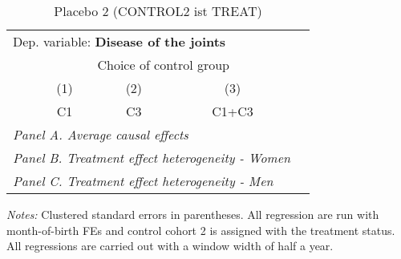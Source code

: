  \begin{table}[H] \centering \begin{threeparttable} \caption{Placebo 2 (CONTROL2 ist TREAT) } {\def\sym#1{\ifmmode^{#1}\else\(^{#1}\)\fi} \begin{tabular}{l*{4}{c}} \toprule \multicolumn{4}{l}{Dep. variable: \textbf{Disease of the joints}} \\ & \multicolumn{3}{c}{Choice of control group} \\ \cmidrule(lr){2-4}
            &\multicolumn{1}{c}{(1)}&\multicolumn{1}{c}{(2)}&\multicolumn{1}{c}{(3)}\\
            &\multicolumn{1}{c}{C1}&\multicolumn{1}{c}{C3}&\multicolumn{1}{c}{C1+C3}\\
\midrule
 \multicolumn{4}{l}{\emph{Panel A. Average causal effects}} \\      \midrule\multicolumn{4}{l}{\emph{Panel B. Treatment effect heterogeneity - Women}} \\      \midrule\multicolumn{4}{l}{\emph{Panel C. Treatment effect heterogeneity - Men}} \\      
\bottomrule \end{tabular} } \begin{tablenotes} \item \scriptsize \emph{Notes:} Clustered standard errors in parentheses. All regression are run with month-of-birth FEs and control cohort 2 is assigned with the treatment status. All regressions are carried out with a window width of half a year. \end{tablenotes} \end{threeparttable} \end{table} 
